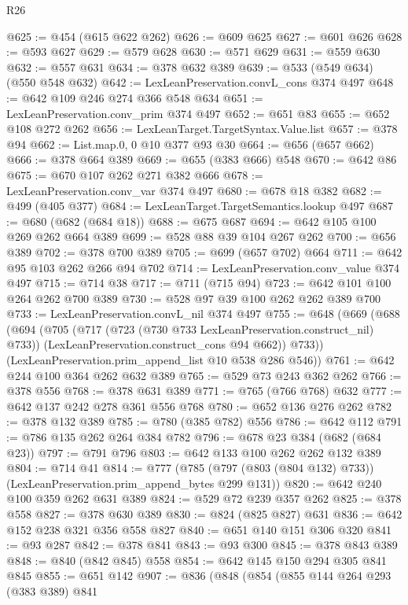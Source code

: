 \begin{lexlean}{R26}
\begin{coremodule}
{{{{{@625 := @454 (@615 @622 @262)
@626 := @609 @625
@627 := @601 @626
@628 := @593 @627
@629 := @579 @628
@630 := @571 @629
@631 := @559 @630
@632 := @557 @631
@634 := @378 @632 @389
@639 := @533 (@549 @634) (@550 @548 @632)
@642 := LexLeanPreservation.convL_cons @374 @497
@648 := @642 @109 @246 @274 @366 @548 @634
@651 := LexLeanPreservation.conv_prim @374 @497
@652 := @651 @83
@655 := @652 @108 @272 @262
@656 := LexLeanTarget.TargetSyntax.Value.list
@657 := @378 @94
@662 := List.map.{0, 0} @10 @377 @93 @30
@664 := @656 (@657 @662)
@666 := @378 @664 @389
@669 := @655 (@383 @666) @548
@670 := @642 @86
@675 := @670 @107 @262 @271 @382 @666
@678 := LexLeanPreservation.conv_var @374 @497
@680 := @678 @18 @382
@682 := @499 (@405 @377)
@684 := LexLeanTarget.TargetSemantics.lookup @497
@687 := @680 (@682 (@684 @18))
@688 := @675 @687
@694 := @642 @105 @100 @269 @262 @664 @389
@699 := @528 @88 @39 @104 @267 @262
@700 := @656 @389
@702 := @378 @700 @389
@705 := @699 (@657 @702) @664
@711 := @642 @95 @103 @262 @266 @94 @702
@714 := LexLeanPreservation.conv_value @374 @497
@715 := @714 @38
@717 := @711 (@715 @94)
@723 := @642 @101 @100 @264 @262 @700 @389
@730 := @528 @97 @39 @100 @262 @262 @389 @700
@733 := LexLeanPreservation.convL_nil @374 @497
@755 := @648
    (@669
      (@688
        (@694
          (@705
            (@717 (@723 (@730 @733 LexLeanPreservation.construct_nil) @733))
            (LexLeanPreservation.construct_cons @94 @662))
          @733))
      (LexLeanPreservation.prim_append_list @10 @538 @286 @546))
@761 := @642 @244 @100 @364 @262 @632 @389
@765 := @529 @73 @243 @362 @262
@766 := @378 @556
@768 := @378 @631 @389
@771 := @765 (@766 @768) @632
@777 := @642 @137 @242 @278 @361 @556 @768
@780 := @652 @136 @276 @262
@782 := @378 @132 @389
@785 := @780 (@385 @782) @556
@786 := @642 @112
@791 := @786 @135 @262 @264 @384 @782
@796 := @678 @23 @384 (@682 (@684 @23))
@797 := @791 @796
@803 := @642 @133 @100 @262 @262 @132 @389
@804 := @714 @41
@814 := @777 (@785 (@797 (@803 (@804 @132) @733)) (LexLeanPreservation.prim_append_bytes @299 @131))
@820 := @642 @240 @100 @359 @262 @631 @389
@824 := @529 @72 @239 @357 @262
@825 := @378 @558
@827 := @378 @630 @389
@830 := @824 (@825 @827) @631
@836 := @642 @152 @238 @321 @356 @558 @827
@840 := @651 @140 @151 @306 @320
@841 := @93 @287
@842 := @378 @841
@843 := @93 @300
@845 := @378 @843 @389
@848 := @840 (@842 @845) @558
@854 := @642 @145 @150 @294 @305 @841 @845
@855 := @651 @142
@907 := @836
    (@848
      (@854
        (@855
          @144
          @264
          @293
          (@383 @389)
          @841
}}}}}
\end{coremodule}
\end{lexlean}
